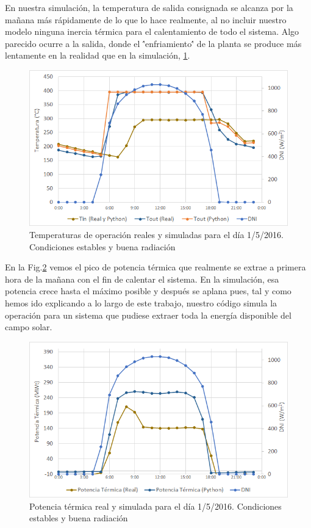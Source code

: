 En nuestra simulación, la temperatura de salida consignada se alcanza por la mañana más rápidamente de lo que lo hace realmente, al no incluir nuestro modelo ninguna inercia térmica para el calentamiento de todo el sistema. Algo parecido ocurre a la salida, donde el \''enfriamiento\'' de la planta se produce más lentamente en la realidad que en la simulación, \ref{fig:temperatura_1b}.

\begin{figure}[H]
\includegraphics[width=0.9\linewidth]{images/temperatura_aste1b_01052016.png}
\caption[Temperaturas de operación reales y simuladas en un día de condiciones estables]{Temperaturas de operación reales y simuladas para el día 1/5/2016. Condiciones estables y buena radiación} 
\label{fig:temperatura_1b}
\end{figure}

En la  Fig.\ref{fig:potencia_1b} vemos el pico de potencia térmica que realmente se extrae a primera hora de la mañana con el fin de calentar el sistema. En la simulación, esa potencia crece hasta el máximo posible y después se aplana pues, tal y como hemos ido explicando a lo largo de este trabajo, nuestro código simula la operación para un sistema que pudiese extraer toda la energía disponible del campo solar. 

\begin{figure}[H]
\includegraphics[width=0.9\linewidth]{images/potencia_aste1b_01052016.png}
\caption[Potencia térmica real y simulada en un día de condiciones estables]{Potencia térmica real y simulada para el día 1/5/2016. Condiciones estables y buena radiación} 
\label{fig:potencia_1b}
\end{figure}

